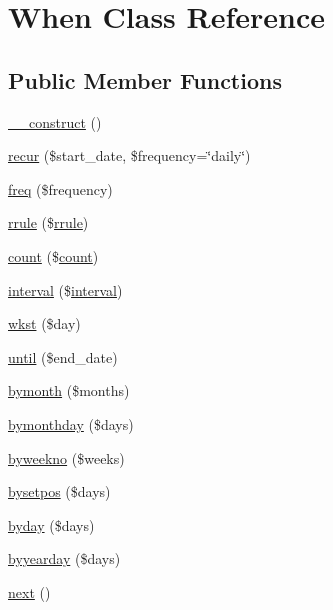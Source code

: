 \hypertarget{class_when}{\section{\-When \-Class \-Reference}
\label{class_when}
}
\subsection*{\-Public \-Member \-Functions}
\begin{DoxyCompactItemize}
\item 
\hyperlink{class_when_a095c5d389db211932136b53f25f39685}{\-\_\-\-\_\-construct} ()
\item 
\hyperlink{class_when_a91e158ffabe2df32a0b75cfe0b774899}{recur} (\$start\-\_\-date, \$frequency=\char`\"{}daily\char`\"{})
\item 
\hyperlink{class_when_a352f040efbbf14f4bb985f4d9b077082}{freq} (\$frequency)
\item 
\hyperlink{class_when_a9eb30a36f809180523d364e87fd2a489}{rrule} (\$\hyperlink{class_when_a9eb30a36f809180523d364e87fd2a489}{rrule})
\item 
\hyperlink{class_when_a1060865be49edccc59e80b37cdf622f3}{count} (\$\hyperlink{class_when_a1060865be49edccc59e80b37cdf622f3}{count})
\item 
\hyperlink{class_when_af3b0b324d22a2cd686e44711fc3ff25e}{interval} (\$\hyperlink{class_when_af3b0b324d22a2cd686e44711fc3ff25e}{interval})
\item 
\hyperlink{class_when_a7adc47937eecbbdf1c6190baf4474bda}{wkst} (\$day)
\item 
\hyperlink{class_when_ae66b9c2794ad0a05a02796727406e235}{until} (\$end\-\_\-date)
\item 
\hyperlink{class_when_a53cb6d1f15a1db4469158bc3c5429a14}{bymonth} (\$months)
\item 
\hyperlink{class_when_a15a2ebc4cd881fd6afff1cbddae5c65a}{bymonthday} (\$days)
\item 
\hyperlink{class_when_ac55275c6af64d42b2953e431ab77f832}{byweekno} (\$weeks)
\item 
\hyperlink{class_when_af8ae916a06bad759207662ad7c19ba93}{bysetpos} (\$days)
\item 
\hyperlink{class_when_a5e8d3130e209037324edba07cc2e1d8f}{byday} (\$days)
\item 
\hyperlink{class_when_a853a40aad304a2b25c30d44f57e272f3}{byyearday} (\$days)
\item 
\hyperlink{class_when_acea62048bfee7b3cd80ed446c86fb78a}{next} ()
\end{DoxyCompactItemize}
